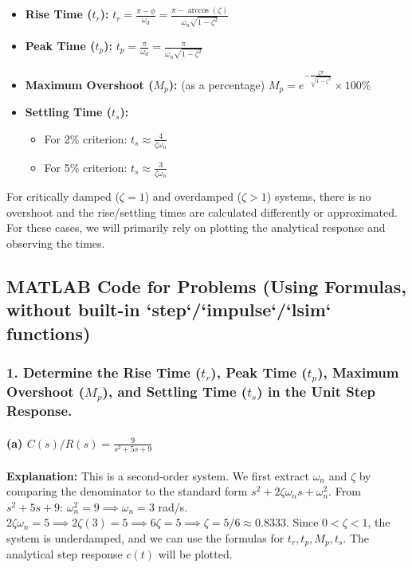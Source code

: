 \documentclass{article}
\begin{document}
	\begin{itemize}
		\item \textbf{Rise Time ($t_r$):}
		$t_r = \frac{\pi - \phi}{\omega_d} = \frac{\pi - \arccos(\zeta)}{\omega_n \sqrt{1-\zeta^2}}$
		
		\item \textbf{Peak Time ($t_p$):}
		$t_p = \frac{\pi}{\omega_d} = \frac{\pi}{\omega_n \sqrt{1-\zeta^2}}$
		
		\item \textbf{Maximum Overshoot ($M_p$):} (as a percentage)
		$M_p = e^{-\frac{\zeta\pi}{\sqrt{1-\zeta^2}}} \times 100\%$
		
		\item \textbf{Settling Time ($t_s$):}
		\begin{itemize}
			\item For 2\% criterion: $t_s \approx \frac{4}{\zeta\omega_n}$
			\item For 5\% criterion: $t_s \approx \frac{3}{\zeta\omega_n}$
		\end{itemize}
	\end{itemize}
	For critically damped ($\zeta=1$) and overdamped ($\zeta>1$) systems, there is no overshoot and the rise/settling times are calculated differently or approximated. For these cases, we will primarily rely on plotting the analytical response and observing the times.
	
	\subsection*{MATLAB Code for Problems (Using Formulas, without built-in `step`/`impulse`/`lsim` functions)}
	
	\subsubsection*{1. Determine the Rise Time ($t_r$), Peak Time ($t_p$), Maximum Overshoot ($M_p$), and Settling Time ($t_s$) in the Unit Step Response.}
	
	\paragraph{(a) $C(s)/R(s) = \frac{9}{s^2+5s+9}$}
	\textbf{Explanation:}
	This is a second-order system. We first extract $\omega_n$ and $\zeta$ by comparing the denominator to the standard form $s^2 + 2\zeta\omega_n s + \omega_n^2$.
	From $s^2+5s+9$:
	$\omega_n^2 = 9 \implies \omega_n = 3$ rad/s.
	$2\zeta\omega_n = 5 \implies 2\zeta(3) = 5 \implies 6\zeta = 5 \implies \zeta = 5/6 \approx 0.8333$.
	Since $0 < \zeta < 1$, the system is underdamped, and we can use the formulas for $t_r, t_p, M_p, t_s$.
	The analytical step response $c(t)$ will be plotted.
	
\end{document}
